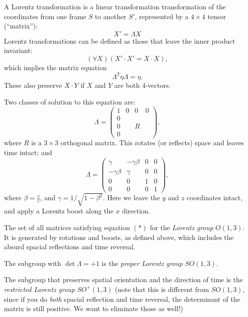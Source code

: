 \documentclass[a4paper]{article}
\begin{document}
A Lorentz transformation is a linear transformation transformation of the coordinates from one frame $S$ to another $S'$, represented by a $4\times 4$ tensor (``matrix''):
\[
  X' = \Lambda X
\]
Lorentz transformations can be defined as those that leave the inner product invariant:
\[
  (\forall X)(X'\cdot X' = X\cdot X),
\]
which implies the matrix equation
\[
  \Lambda^T\eta \Lambda = \eta.\tag{$*$}
\]
These also preserve $X\cdot Y$ if $X$ and $Y$ are both 4-vectors.

Two classes of solution to this equation are:
\[
  \Lambda = 
  \begin{pmatrix}
    1 & 0 & 0 & 0\\
    0\\
    0 & & R\\
    0
  \end{pmatrix},
\]
where $R$ is a $3\times 3$ orthogonal matrix. This rotates (or reflects) space and leaves time intact; and
\[
  \Lambda =
  \begin{pmatrix}
    \gamma & -\gamma \beta & 0 & 0\\
    -\gamma\beta & \gamma & 0 & 0\\
    0 & 0 & 1 & 0\\
    0 & 0 & 0 & 1
  \end{pmatrix},
\]
where $\beta = \frac{v}{c}$, and $\gamma = 1/\sqrt{1 - \beta^2}$. Here we leave the $y$ and $z$ coordinates intact, and apply a Lorentz boost along the $x$ direction.

The set of all matrices satisfying equation $(*)$ for the \emph{Lorentz group} $O(1, 3)$. It is generated by rotations and boosts, as defined above, which includes the absurd spacial reflections and time reversal.

The subgroup with $\det \Lambda = +1$ is the \emph{proper Lorentz group} $SO(1, 3)$.

The subgroup that preserves spatial orientation and the direction of time is the \emph{restricted Lorentz group} $SO^+(1, 3)$ (note that this is different from $SO(1, 3)$, since if you do \emph{both} spacial reflection and time reversal, the determinant of the matrix is still positive. We want to eliminate those as well!)
\end{document}
